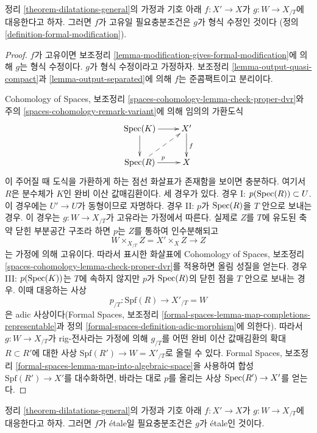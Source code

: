 \begin{lemma}
\label{lemma-output-proper}
정리 \ref{theorem-dilatations-general}의 가정과 기호 아래
$f : X' \to X$가 $g : W \to X_{/T}$에 대응한다고 하자.
그러면 $f$가 고유일 필요충분조건은 $g$가 형식 수정인 것이다
(정의 \ref{definition-formal-modification}).
\end{lemma}

\begin{proof}
$f$가 고유이면 보조정리
\ref{lemma-modification-gives-formal-modification}에 의해
$g$는 형식 수정이다. $g$가 형식 수정이라고 가정하자.
보조정리 \ref{lemma-output-quasi-compact}과
\ref{lemma-output-separated}에 의해
$f$는 준콤팩트이고 분리이다.

\medskip\noindent
Cohomology of Spaces, 보조정리
\ref{spaces-cohomology-lemma-check-proper-dvr}와
주의 \ref{spaces-cohomology-remark-variant}에 의해
임의의 가환도식
$$
\xymatrix{
\Spec(K) \ar[r] \ar[d] & X' \ar[d]^f \\
\Spec(R) \ar[r]^p \ar@{-->}[ru] & X
}
$$
이 주어질 때 도식을 가환하게 하는 점선 화살표가 존재함을 보이면 충분하다.
여기서 $R$은 분수체가 $K$인 완비 이산 값매김환이다.
세 경우가 있다.
경우 I: $p(\mathop{\mathrm{Spec}}(R)) \subset U$. 이 경우에는
$U' \to U$가 동형이므로 자명하다.
경우 II: $p$가 $\mathop{\mathrm{Spec}}(R)$을 $T$ 안으로 보내는 경우.
이 경우는 $g : W \to X_{/T}$가 고유라는 가정에서 따른다.
실제로 $Z$를 $T$에 유도된 축약 닫힌 부분공간 구조라 하면
$p$는 $Z$를 통하여 인수분해되고
$$
W \times_{X_{/T}} Z = X' \times_X Z \longrightarrow Z
$$
는 가정에 의해 고유이다. 따라서 표시한 화살표에
Cohomology of Spaces, 보조정리
\ref{spaces-cohomology-lemma-check-proper-dvr}를 적용하면
올림 성질을 얻는다.
경우 III: $p(\mathop{\mathrm{Spec}}(K))$는 $T$에 속하지 않지만
$p$가 $\mathop{\mathrm{Spec}}(R)$의 닫힌 점을 $T$ 안으로 보내는 경우.
이때 대응하는 사상
$$
p_{/T} : \text{Spf}(R) \longrightarrow X'_{/T} = W
$$
은 adic 사상이다(Formal Spaces, 보조정리
\ref{formal-spaces-lemma-map-completions-representable}과
정의 \ref{formal-spaces-definition-adic-morphism}에 의한다).
따라서 $g : W \to X_{/T}$가 rig-전사라는 가정에 의해
$g_{/T}$를 어떤 완비 이산 값매김환의 확대 $R \subset R'$에 대한
사상 $\text{Spf}(R') \to W = X'_{/T}$로 올릴 수 있다.
Formal Spaces, 보조정리
\ref{formal-spaces-lemma-map-into-algebraic-space}을 사용하여
합성 $\text{Spf}(R') \to X'$를 대수화하면,
바라는 대로 $p$를 올리는 사상 $\mathop{\mathrm{Spec}}(R') \to X'$를 얻는다.
\end{proof}

\begin{lemma}
\label{lemma-output-etale}
정리 \ref{theorem-dilatations-general}의 가정과 기호 아래
$f : X' \to X$가 $g : W \to X_{/T}$에 대응한다고 하자.
그러면 $f$가 \'etale일 필요충분조건은 $g$가 \'etale인 것이다.
\end{lemma}

